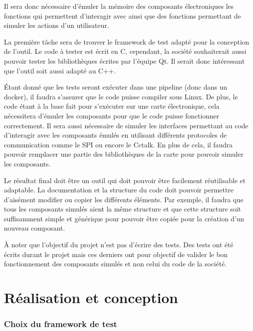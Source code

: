 \documentclass[a4paper]{article}
\begin{document}
Il sera donc nécessaire d'émuler la mémoire des composants électroniques les
fonctions qui permettent d'interagir avec ainsi que des fonctions permettant de
simuler les actions d'un utilisateur.

La première tâche sera de trouver le framework de test adapté pour la conception
de l'outil. Le code à tester est écrit en C, cependant, la société souhaiterait
aussi pouvoir tester les bibliothèques écrites par l'équipe Qt. Il serait donc
intéressant que l'outil soit aussi adapté au C++.

Étant donné que les tests seront exécuter dans une pipeline (donc dans un
docker), il faudra s'assurer que le code puisse compiler sous Linux. De plus, le
code étant à la base fait pour s'exécuter sur une carte électronique, cela
nécessitera d'émuler les composants pour que le code puisse fonctionner
correctement. Il sera aussi nécessaire de simuler les interfaces permettant au
code d'interagir avec les composants émulés en utilisant différents protocoles
de communication comme le SPI ou encore le Cctalk. En plus de cela, il faudra
pouvoir remplacer une partie des bibliothèques de la carte pour pouvoir simuler
les composants.

Le résultat final doit être un outil qui doit pouvoir être facilement
réutilisable et adaptable. La documentation et la structure du code doit pouvoir
permettre d'aisément modifier ou copier les différents éléments. Par exemple, il
faudra que tous les composants simulés aient la même structure et que cette
structure soit suffisamment simple et générique pour pouvoir être copiée pour la
création d'un nouveau composant.

À noter que l'objectif du projet n'est pas d'écrire des tests. Des tests ont été
écrits durant le projet mais ces derniers ont pour objectif de valider le bon
fonctionnement des composants simulés et non celui du code de la société.


\clearpage
\part{Réalisation et conception}

\section{Choix du framework de test}
\end{document}
